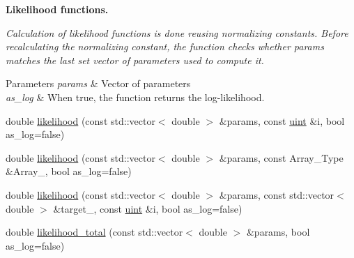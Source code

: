 \begin{Indent}\textbf{ Likelihood functions.}\par
{\em Calculation of likelihood functions is done reusing normalizing constants. Before recalculating the normalizing constant, the function checks whether {\ttfamily params} matches the last set vector of parameters used to compute it.


\begin{DoxyParams}{Parameters}
{\em params} & Vector of parameters \\
\hline
{\em as\+\_\+log} & When {\ttfamily true}, the function returns the log-\/likelihood. \\
\hline
\end{DoxyParams}
}\begin{DoxyCompactItemize}
\item 
double \hyperlink{class_model_ae75fe2213980b6b245e279c7836ab99b}{likelihood} (const std\+::vector$<$ double $>$ \&params, const \hyperlink{typedefs_8hpp_a91ad9478d81a7aaf2593e8d9c3d06a14}{uint} \&i, bool as\+\_\+log=false)
\item 
double \hyperlink{class_model_a1a11a54860e22fbd152de4d7cfd30b89}{likelihood} (const std\+::vector$<$ double $>$ \&params, const Array\+\_\+\+Type \&Array\+\_\+, bool as\+\_\+log=false)
\item 
double \hyperlink{class_model_ab88f541fc010f0ee1a415c9cb6c292b7}{likelihood} (const std\+::vector$<$ double $>$ \&params, const std\+::vector$<$ double $>$ \&target\+\_\+, const \hyperlink{typedefs_8hpp_a91ad9478d81a7aaf2593e8d9c3d06a14}{uint} \&i, bool as\+\_\+log=false)
\item 
double \hyperlink{class_model_a31d16ef478d772cedde0813575074a0f}{likelihood\+\_\+total} (const std\+::vector$<$ double $>$ \&params, bool as\+\_\+log=false)
\end{DoxyCompactItemize}
\end{Indent}
